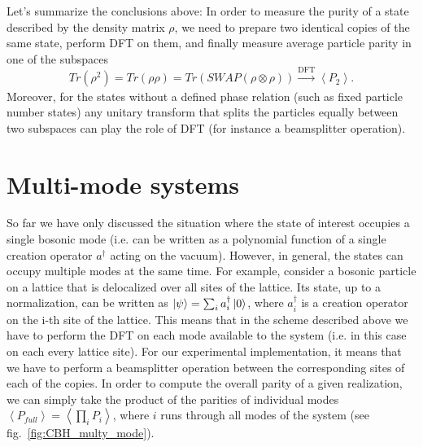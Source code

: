 Let's summarize the conclusions above: In order to measure the purity of a state described by the density matrix $\rho$, we need to prepare two identical copies of the same state, perform DFT on them, and finally measure average particle parity in one of the subspaces
\begin{equation}
Tr(\rho^2) = Tr(\rho\rho) = Tr(SWAP(\rho \otimes \rho)) \xrightarrow[]{\text{DFT}} \left< P_2 \right>.
\end{equation}
Moreover, for the states without a defined phase relation (such as fixed particle number states) any unitary transform that splits the particles equally between two subspaces can play the role of DFT (for instance a beamsplitter operation).

\section{Multi-mode systems}
So far we have only discussed the situation where the state of interest occupies a single bosonic mode (i.e. can be written as a polynomial function of a single creation operator $a^{\dagger}$ acting on the vacuum). However, in general, the states can occupy multiple modes at the same time. For example, consider a bosonic particle on a lattice that is delocalized over all sites of the lattice. Its state, up to a normalization, can be written as $\left|\psi\right\rangle = \sum_i a_i^{\dagger} \left|0\right\rangle$, where $a_i^{\dagger}$ is a creation operator on the i-th site of the lattice. This means that in the scheme described above we have to perform the DFT on each mode available to the system (i.e. in this case on each every lattice site). For our experimental implementation, it means that we have to perform a beamsplitter operation between the corresponding sites of each of the copies. In order to compute the overall parity of a given realization, we can simply take the product of the parities of individual modes $\left<P_{full}\right> = \left< \prod_i P_i \right>$, where $i$ runs through all modes of the system (see fig.~\ref{fig:CBH_multy_mode}).

